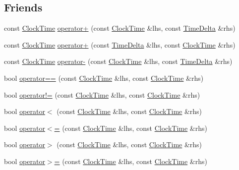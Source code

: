 \subsection*{\-Friends}
\begin{DoxyCompactItemize}
\item 
const \hyperlink{structClockTime}{\-Clock\-Time} \hyperlink{structClockTime_afceb2935d4b931a097145e4967ac71b6}{operator+} (const \hyperlink{structClockTime}{\-Clock\-Time} \&lhs, const \hyperlink{structTimeDelta}{\-Time\-Delta} \&rhs)
\item 
const \hyperlink{structClockTime}{\-Clock\-Time} \hyperlink{structClockTime_a5b2a233507a3e162854b69240c9c1091}{operator+} (const \hyperlink{structTimeDelta}{\-Time\-Delta} \&lhs, const \hyperlink{structClockTime}{\-Clock\-Time} \&rhs)
\item 
const \hyperlink{structClockTime}{\-Clock\-Time} \hyperlink{structClockTime_a21ba0831914be0b997460299bf287cf3}{operator-\/} (const \hyperlink{structClockTime}{\-Clock\-Time} \&lhs, const \hyperlink{structTimeDelta}{\-Time\-Delta} \&rhs)
\item 
bool \hyperlink{structClockTime_a69e5484eac6807a928f087cfa84637df}{operator==} (const \hyperlink{structClockTime}{\-Clock\-Time} \&lhs, const \hyperlink{structClockTime}{\-Clock\-Time} \&rhs)
\item 
bool \hyperlink{structClockTime_a9a90069d85b56c30d69ab78e949c3911}{operator!=} (const \hyperlink{structClockTime}{\-Clock\-Time} \&lhs, const \hyperlink{structClockTime}{\-Clock\-Time} \&rhs)
\item 
bool \hyperlink{structClockTime_a1559fb2a3b03d37e75624999c9da2bc8}{operator$<$} (const \hyperlink{structClockTime}{\-Clock\-Time} \&lhs, const \hyperlink{structClockTime}{\-Clock\-Time} \&rhs)
\item 
bool \hyperlink{structClockTime_ae86e4ffa336f7ef101ab39631a143c19}{operator$<$=} (const \hyperlink{structClockTime}{\-Clock\-Time} \&lhs, const \hyperlink{structClockTime}{\-Clock\-Time} \&rhs)
\item 
bool \hyperlink{structClockTime_af8b6940e326db070a338d4adb7d54bd9}{operator$>$} (const \hyperlink{structClockTime}{\-Clock\-Time} \&lhs, const \hyperlink{structClockTime}{\-Clock\-Time} \&rhs)
\item 
bool \hyperlink{structClockTime_af2d17dcdd53d7cb57311cebe530be868}{operator$>$=} (const \hyperlink{structClockTime}{\-Clock\-Time} \&lhs, const \hyperlink{structClockTime}{\-Clock\-Time} \&rhs)
\end{DoxyCompactItemize}


